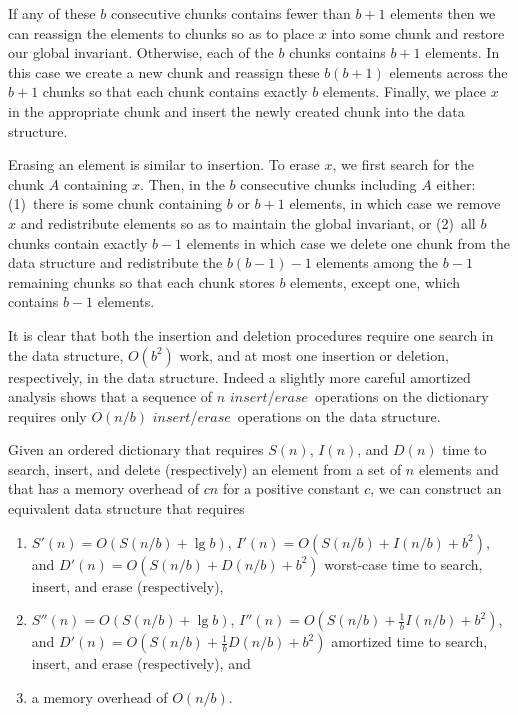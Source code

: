 \documentclass{DIKU-article}
\newcommand{\Erase}{\mbox{$\mathit{erase}$}}
\newcommand{\Insert}{\mbox{$\mathit{insert}$}}
\begin{document}
If any of these $b$ consecutive chunks contains fewer than $b+1$
elements then we can reassign the elements to chunks so as to place
$x$ into some chunk and restore our global invariant.  Otherwise, each
of the $b$ chunks contains $b+1$ elements.  In this case we create a
new chunk and reassign these $b(b+1)$ elements across the $b+1$ chunks
so that each chunk contains exactly $b$ elements.  Finally, we place
$x$ in the appropriate chunk and insert the newly created chunk into
the data structure.

Erasing an element is similar to insertion. To erase $x$, we first
search for the chunk $A$ containing $x$. Then, in the $b$ consecutive
chunks including $A$ either: (1)~there is some chunk containing $b$ or
$b+1$ elements, in which case we remove $x$ and redistribute elements
so as to maintain the global invariant, or (2)~all $b$ chunks contain
exactly $b-1$ elements in which case we delete one chunk from the
data structure and redistribute the $b(b-1)-1$ elements among the $b-1$
remaining chunks so that each chunk stores $b$ elements, except one,
which contains $b-1$ elements.

It is clear that both the insertion and deletion procedures require
one search in the data structure, $O(b^2)$ work, and at most one
insertion or deletion, respectively, in the data structure.  Indeed a
slightly more careful amortized analysis shows that a sequence of $n$
\Insert/\Erase\ operations on the dictionary requires only $O(n/b)$
\Insert/\Erase\ operations on the data structure.  

\begin{theorem}
\label{theorem:elementary-a}
Given an ordered dictionary that requires $S(n)$, $I(n)$, and $D(n)$
time to search, insert, and delete (respectively) an element from a
set of $n$ elements and that has a memory overhead of $cn$ for a
positive constant $c$, we can construct an equivalent data structure
that requires
\begin{enumerate}
\item $S'(n)=O(S(n/b)+\lg b)$, $I'(n)=O(S(n/b)+I(n/b)+b^2)$,
and $D'(n)=O(S(n/b)+D(n/b)+b^2)$ worst-case time to search, insert,
and erase (respectively), 
\item $S''(n)=O(S(n/b)+\lg b)$,
$I''(n)=O(S(n/b)+\frac{1}{b}I(n/b)+b^2)$, and
$D'(n)=O(S(n/b)+\frac{1}{b}D(n/b)+b^2)$ amortized time to search,
insert, and erase (respectively), and 
\item a memory overhead of $O(n/b)$.
\end{enumerate}
\end{theorem}
\end{document}
